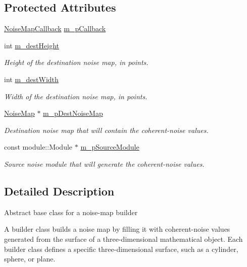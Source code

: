 \subsection*{Protected Attributes}
\begin{DoxyCompactItemize}
\item 
\hyperlink{namespacenoise_1_1utils_af10741a3394fadf8798a8f40b753b208}{Noise\+Map\+Callback} \hyperlink{classnoise_1_1utils_1_1_noise_map_builder_adf2a8d0f463ba83c0efabffc83b0074c}{m\+\_\+p\+Callback}
\item 
int \hyperlink{classnoise_1_1utils_1_1_noise_map_builder_a06a6db4772fe959e741be9ebe2023ce8}{m\+\_\+dest\+Height}
\begin{DoxyCompactList}\small\item\em Height of the destination noise map, in points. \end{DoxyCompactList}\item 
int \hyperlink{classnoise_1_1utils_1_1_noise_map_builder_a95d8075e9917c2a1c319a0afe639dd31}{m\+\_\+dest\+Width}
\begin{DoxyCompactList}\small\item\em Width of the destination noise map, in points. \end{DoxyCompactList}\item 
\hyperlink{classnoise_1_1utils_1_1_noise_map}{Noise\+Map} $\ast$ \hyperlink{classnoise_1_1utils_1_1_noise_map_builder_a6de6a3c7781f2823b10057d6a657b631}{m\+\_\+p\+Dest\+Noise\+Map}
\begin{DoxyCompactList}\small\item\em Destination noise map that will contain the coherent-\/noise values. \end{DoxyCompactList}\item 
const module\+::\+Module $\ast$ \hyperlink{classnoise_1_1utils_1_1_noise_map_builder_a45b357c74061bc078bc800605c3c1636}{m\+\_\+p\+Source\+Module}
\begin{DoxyCompactList}\small\item\em Source noise module that will generate the coherent-\/noise values. \end{DoxyCompactList}\end{DoxyCompactItemize}


\subsection{Detailed Description}
Abstract base class for a noise-\/map builder

A builder class builds a noise map by filling it with coherent-\/noise values generated from the surface of a three-\/dimensional mathematical object. Each builder class defines a specific three-\/dimensional surface, such as a cylinder, sphere, or plane.

